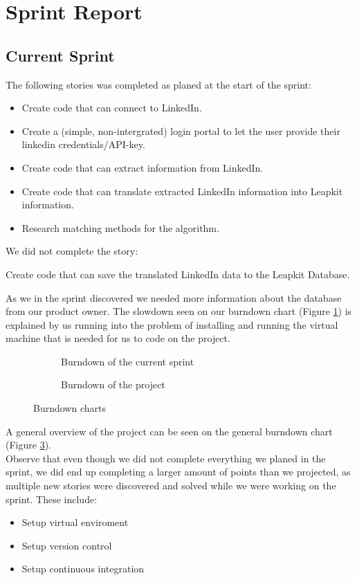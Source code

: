 \newpage
\section{Sprint Report}

\subsection{Current Sprint}

The following stories was completed as planed at the start of the sprint:
\begin{itemize}
    \item Create code that can connect to LinkedIn.
    \item Create a (simple, non-intergrated) login portal to let the user provide their linkedin credentials/API-key. 
    \item Create code that can extract information from LinkedIn.
    \item Create code that can translate extracted LinkedIn information into Leapkit information.
    \item Research matching methods for the algorithm.
\end{itemize}
We did not complete the story:
\begin{center}
    Create code that can save the translated LinkedIn data to the Leapkit Database.
\end{center}
As we in the sprint discovered we needed more information about the database from our product owner. The slowdown seen on our burndown chart (Figure \ref{fig:burndownSprint}) is explained by us running into the problem of installing and running the virtual machine that is needed for us to code on the project.\\
\begin{figure}[!ht]
    \centering
    \begin{subfigure}[b]{0.5\textwidth}
        \scalebox{.6}{}
        \caption{Burndown of the current sprint}
        \label{fig:burndownSprint}
    \end{subfigure}%
    \begin{subfigure}[b]{0.5\textwidth}
        \scalebox{.7}{}
        \caption{Burndown of the project}
        \label{fig:burndownProject}
    \end{subfigure}
    \caption{Burndown charts}
\end{figure}
A general overview of the project can be seen on the general burndown chart (Figure \ref{fig:burndownProject}).\\
Observe that even though we did not complete everything we planed in the sprint, we did end up completing a larger amount of points than we projected, as multiple new stories were discovered and solved while we were working on the sprint. These include:
\begin{itemize}
    \item Setup virtual enviroment 
    \item Setup version control
    \item Setup continuous integration
\end{itemize}

